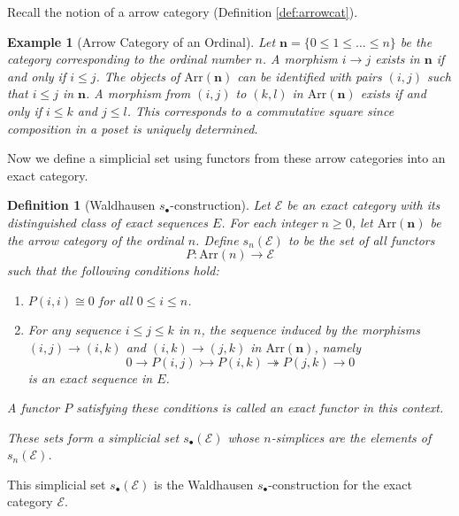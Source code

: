 \documentclass[12pt]{report}
\numberwithin{equation}{section}
\newtheorem{definition}[dummy]{Definition}
\newtheorem{example}[dummy]{Example}
\begin{document}
	
	Recall the notion of a arrow category (Definition \ref{def:arrowcat}).
	
	\begin{example}[Arrow Category of an Ordinal]
		Let $\mathbf{n} = \{0 \leq 1 \leq \dots \leq n\}$ be the category corresponding to the ordinal number $n$. A morphism $i \to j$ exists in $\mathbf{n}$ if and only if $i \leq j$. The objects of $\mathrm{Arr}(\mathbf{n})$ can be identified with pairs $(i, j)$ such that $i \leq j$ in $\mathbf{n}$. A morphism from $(i, j)$ to $(k, l)$ in $\mathrm{Arr}(\mathbf{n})$ exists if and only if $i \leq k$ and $j \leq l$. This corresponds to a commutative square since composition in a poset is uniquely determined.
	\end{example}
	
	Now we define a simplicial set using functors from these arrow categories into an exact category.
	
	\begin{definition}[Waldhausen \( s_\bullet \)-construction]
		Let $\mathcal{E}$ be an exact category with its distinguished class of exact sequences $E$. For each integer $n \geq 0$, let $\mathrm{Arr}(\mathbf{n})$ be the arrow category of the ordinal $n$.
		Define $s_n(\mathcal{E})$ to be the set of all functors
		\[ P: \mathrm{Arr}(n) \to \mathcal{E} \]
		such that the following conditions hold:
		\begin{enumerate}
			\item $P(i, i) \cong 0$ for all $0 \leq i \leq n$.
			\item For any sequence $i \leq j \leq k$ in $n$, the sequence induced by the morphisms $(i,j) \to (i,k)$ and $(i,k) \to (j,k)$ in $\mathrm{Arr}(\mathbf{n})$, namely
			\[ 0 \to P(i, j) \rightarrowtail P(i, k) \twoheadrightarrow P(j, k) \to 0 \]
			is an exact sequence in $E$.
		\end{enumerate}
		A functor $P$ satisfying these conditions is called an exact functor in this context.
		
		These sets form a simplicial set $s_\bullet(\mathcal{E})$ whose $n$-simplices are the elements of $s_n(\mathcal{E})$.
	\end{definition}
	
	This simplicial set $s_\bullet(\mathcal{E})$ is the Waldhausen \( s_\bullet \)-construction for the exact category $\mathcal{E}$.
	
\end{document}
